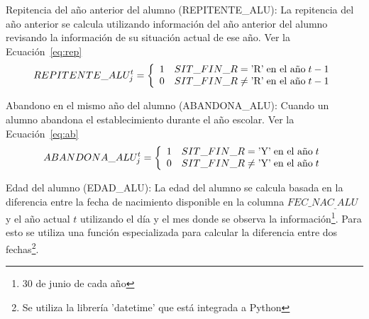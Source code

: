 \begin{longdescription}
\begin{longdescription}
              \item[Repitencia del año anterior del alumno] (REPITENTE\_ALU): La repitencia del año anterior se calcula utilizando información del año anterior del alumno revisando la información de su situación actual de ese año. Ver la Ecuación~\ref{eq:rep}
              \begin{equation}
              \centering
              REPITENTE\_ALU_{j}^{t} = \left\{
                \begin{array}{c l}
                 1 & SIT\_FIN\_R = \mbox{'R'}  \; \mbox{en el año} \; t - 1\\
                 0 & SIT\_FIN\_R \neq \mbox{'R'} \; \mbox{en el año} \; t - 1
                \end{array}
                \right.
                \label{eq:rep}
              \end{equation}
              \item[Abandono en el mismo año del alumno] (ABANDONA\_ALU): Cuando un alumno abandona el establecimiento durante el año escolar. Ver la Ecuación~\ref{eq:ab}
              \begin{equation}
              \centering
              ABANDONA\_ALU_{j}^{t} = \left\{
                \begin{array}{c l}
                 1 & SIT\_FIN\_R = \mbox{'Y'}  \; \mbox{en el año} \; t\\
                 0 & SIT\_FIN\_R \neq \mbox{'Y'} \; \mbox{en el año} \; t
                \end{array}
                \right.
                \label{eq:ab}
              \end{equation}
              \item[Edad del alumno] (EDAD\_ALU): La edad del alumno se calcula basada en la diferencia entre la fecha de nacimiento disponible en la columna $FEC\_NAC_\_ALU$ y el año actual $t$ utilizando el día y el mes donde se observa la información\footnote{30 de junio de cada año}. Para esto se utiliza una función especializada para calcular la diferencia entre dos fechas\footnote{Se utiliza la librería 'datetime' que está integrada a Python}.
             

\end{longdescription}
\end{longdescription}
